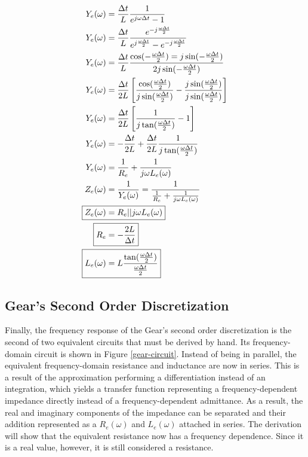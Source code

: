 \documentclass[10pt, oneside, letterpaper]{article}
\begin{document}
\begin{alignat}{2}
Y_e{}(\omega)&=\frac{\Delta{}t}{L}\frac{1}{e^{j\omega{}\Delta{}t}-1} \\
Y_e{}(\omega)&=\frac{\Delta{}t}{L}\frac{e^{-j\frac{\omega{}\Delta{}t}{2}}}{e^{j\frac{\omega{}\Delta{}t}{2}}-e^{-j\frac{\omega{}\Delta{}t}{2}}} \\
Y_e{}(\omega)&=\frac{\Delta{}t}{L}\frac{\cos(-\frac{\omega{}\Delta{}t}{2})=j\sin(-\frac{\omega{}\Delta{}t}{2})}{2j\sin(-\frac{\omega{}\Delta{}t}{2})} \\
Y_e{}(\omega)&=\frac{\Delta{}t}{2L}\left[\frac{\cos(\frac{\omega{}\Delta{}t}{2})}{j\sin(\frac{\omega{}\Delta{}t}{2})}-\frac{j\sin(\frac{\omega{}\Delta{}t}{2})}{j\sin(\frac{\omega{}\Delta{}t}{2})}\right]\\
Y_e{}(\omega)&=\frac{\Delta{}t}{2L}\left[\frac{1}{j\tan(\frac{\omega{}\Delta{}t}{2})}-1\right] \\
Y_e{}(\omega) &= -\frac{\Delta{}t}{2L} + \frac{\Delta{}t}{2L}\frac{1}{j\tan(\frac{\omega{}\Delta{}t}{2})} \\
Y_e{}(\omega) &= \frac{1}{R_e} + \frac{1}{j\omega{}L_e(\omega{})} \\
Z_e{}(\omega) &= \frac{1}{Y_e{}(\omega)} = \frac{1}{\frac{1}{R_e} + \frac{1}{j\omega{}L_e(\omega{})}} \\
\Aboxed{Z_e{}(\omega) &= R_e || j\omega{}L_e{}(\omega{})} \\
\Aboxed{R_e &= -\frac{2L}{\Delta{}t}} \\
\Aboxed{L_e(\omega) &= L\frac{\tan(\frac{\omega{}\Delta{}t}{2})}{\frac{\omega{}\Delta{}t}{2}}}
\end{alignat}

\subsection{Gear's Second Order Discretization}

Finally, the frequency response of the Gear's second order discretization is the second of two equivalent circuits that must be derived by hand. Its frequency-domain circuit is shown in Figure \ref{gear-circuit}. Instead of being in parallel, the equivalent frequency-domain resistance and inductance are now in series. This is a result of the approximation performing a differentiation instead of an integration, which yields a transfer function representing a frequency-dependent impedance directly instead of a frequency-dependent admittance. As a result, the real and imaginary components of the impedance can be separated and their addition represented as a $R_e(\omega{})$ and $L_e(\omega{})$ attached in series. The derivation will show that the equivalent resistance now has a frequency dependence. Since it is a real value, however, it is still considered a resistance.
\end{document}
